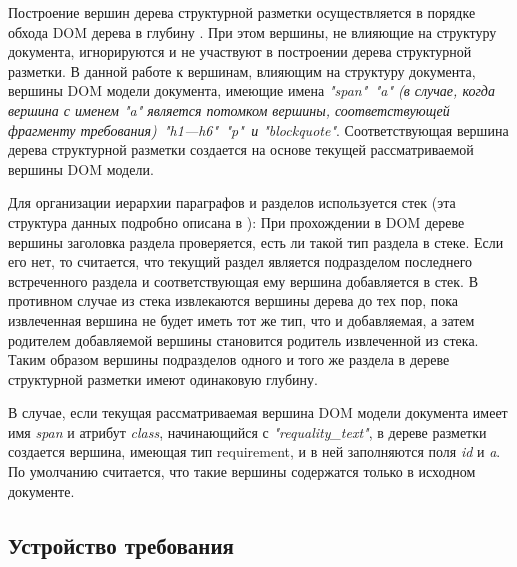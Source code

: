 Построение вершин дерева структурной разметки осуществляется в порядке обхода DOM дерева в глубину \cite{book:Programming}. При этом вершины, не влияющие на структуру документа, игнорируются и не участвуют в построении дерева структурной разметки. В данной работе к вершинам, влияющим на структуру документа, вершины DOM модели документа, имеющие имена \emph{"span"\, "a" (в случае, когда вершина с именем "a" является потомком вершины, соответствующей фрагменту требования)\, "h1---h6"\, "p"\, и "blockquote"}. Соответствующая вершина дерева структурной разметки создается на основе текущей рассматриваемой вершины DOM модели.

Для организации иерархии параграфов и разделов используется стек (эта структура данных подробно описана в \cite{book:Programming}): При прохождении в DOM дереве вершины заголовка раздела проверяется, есть ли такой тип раздела в стеке. Если его нет, то считается, что текущий раздел является подразделом последнего встреченного раздела и соответствующая ему вершина добавляется в стек. В противном случае из стека извлекаются вершины дерева до тех пор, пока извлеченная вершина не будет иметь тот же тип, что и добавляемая, а затем родителем добавляемой вершины становится родитель извлеченной из стека. Таким образом вершины подразделов одного и того же раздела в дереве структурной разметки имеют одинаковую глубину.

В случае, если текущая рассматриваемая вершина DOM модели документа имеет имя \emph{span} и атрибут \emph{class}, начинающийся с \emph{"requality\_text"}, в дереве разметки создается вершина, имеющая тип requirement, и в ней заполняются поля \emph{id} и \emph{a}. По умолчанию считается, что такие вершины содержатся только в исходном документе.

\subsection{Устройство требования}

